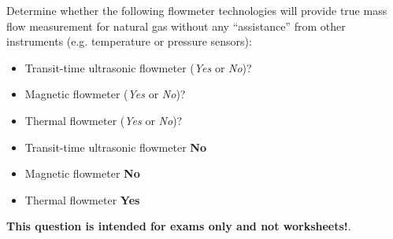 

Determine whether the following flowmeter technologies will provide true mass flow measurement for natural gas without any ``assistance'' from other instruments (e.g. temperature or pressure sensors):

\begin{itemize}
\item{} Transit-time ultrasonic flowmeter ({\it Yes} or {\it No})?
\vskip 10pt
\item{} Magnetic flowmeter ({\it Yes} or {\it No})?
\vskip 10pt
\item{} Thermal flowmeter ({\it Yes} or {\it No})?
\end{itemize}







\begin{itemize}
\item{} Transit-time ultrasonic flowmeter {\bf No}
\item{} Magnetic flowmeter {\bf No}
\item{} Thermal flowmeter {\bf Yes}
\end{itemize}







{\bf This question is intended for exams only and not worksheets!}.



